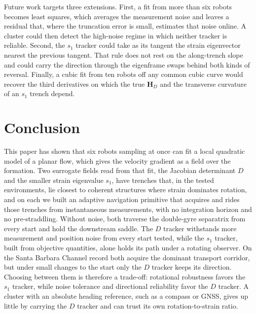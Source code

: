 \documentclass[lettersize,journal]{IEEEtran}
\begin{document}
Future work targets three extensions. First, a fit from more than six
robots becomes least squares, which averages the measurement noise and
leaves a residual that, where the truncation error is small, estimates
that noise online. A cluster could then detect the high-noise regime in
which neither tracker is reliable. Second, the
$s_1$ tracker could take as its tangent the strain eigenvector nearest the
previous tangent. That rule does not rest on the along-trench slope and
could carry the direction through the eigenframe swaps behind both kinds
of reversal. Finally, a cubic
fit from ten robots off any common cubic curve would recover the third
derivatives on which the true $\mathbf{H}_D$ and the transverse curvature
of an $s_1$ trench depend.

\section{Conclusion}

This paper has shown that six robots sampling at once can fit a local
quadratic model of a planar flow, which gives the velocity gradient as a
field over the formation. Two surrogate fields read from that fit, the
Jacobian determinant $D$ and the smaller strain eigenvalue $s_1$, have
trenches that, in the tested environments, lie closest to coherent
structures where strain dominates rotation, and on each we built an adaptive navigation primitive that acquires
and rides those trenches from instantaneous measurements, with no
integration horizon and no pre-straddling. Without noise, both traverse
the double-gyre separatrix from every start and hold the downstream
saddle. The $D$ tracker withstands more measurement and position noise
from every start tested, while the $s_1$ tracker, built from objective
quantities, alone holds its path under a rotating observer. On the Santa
Barbara Channel record both acquire the dominant transport corridor, but
under small changes to the start only the $D$ tracker keeps its
direction. Choosing between them is therefore a trade-off: rotational
robustness favors the $s_1$ tracker, while noise tolerance and directional
reliability favor the $D$ tracker. A cluster with an absolute heading
reference, such as a compass or GNSS, gives up little by carrying the $D$
tracker and can trust its own rotation-to-strain ratio.
\end{document}
